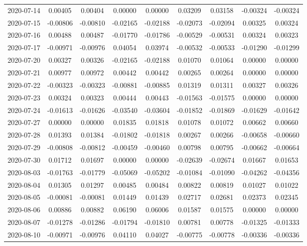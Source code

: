 \begin{footnotesize}
\begin{longtable}{lcccccccc}
2020-07-14 & 0.00405 & 0.00404 & 0.00000 & 0.00000 & 0.03209 & 0.03158 & -0.00324 & -0.00324 \\
2020-07-15 & -0.00806 & -0.00810 & -0.02165 & -0.02188 & -0.02073 & -0.02094 & 0.00325 & 0.00324 \\
2020-07-16 & 0.00488 & 0.00487 & -0.01770 & -0.01786 & -0.00529 & -0.00531 & 0.00324 & 0.00323 \\
2020-07-17 & -0.00971 & -0.00976 & 0.04054 & 0.03974 & -0.00532 & -0.00533 & -0.01290 & -0.01299 \\
2020-07-20 & 0.00327 & 0.00326 & -0.02165 & -0.02188 & 0.01070 & 0.01064 & 0.00000 & 0.00000 \\
2020-07-21 & 0.00977 & 0.00972 & 0.00442 & 0.00442 & 0.00265 & 0.00264 & 0.00000 & 0.00000 \\
2020-07-22 & -0.00323 & -0.00323 & -0.00881 & -0.00885 & 0.01319 & 0.01311 & 0.00327 & 0.00326 \\
2020-07-23 & 0.00324 & 0.00323 & 0.00444 & 0.00443 & -0.01563 & -0.01575 & 0.00000 & 0.00000 \\
2020-07-24 & -0.01613 & -0.01626 & -0.03540 & -0.03604 & -0.01852 & -0.01869 & -0.01629 & -0.01642 \\
2020-07-27 & 0.00000 & 0.00000 & 0.01835 & 0.01818 & 0.01078 & 0.01072 & 0.00662 & 0.00660 \\
2020-07-28 & 0.01393 & 0.01384 & -0.01802 & -0.01818 & 0.00267 & 0.00266 & -0.00658 & -0.00660 \\
2020-07-29 & -0.00808 & -0.00812 & -0.00459 & -0.00460 & 0.00798 & 0.00795 & -0.00662 & -0.00664 \\
2020-07-30 & 0.01712 & 0.01697 & 0.00000 & 0.00000 & -0.02639 & -0.02674 & 0.01667 & 0.01653 \\
2020-08-03 & -0.01763 & -0.01779 & -0.05069 & -0.05202 & -0.01084 & -0.01090 & -0.04262 & -0.04356 \\
2020-08-04 & 0.01305 & 0.01297 & 0.00485 & 0.00484 & 0.00822 & 0.00819 & 0.01027 & 0.01022 \\
2020-08-05 & -0.00081 & -0.00081 & 0.01449 & 0.01439 & 0.02717 & 0.02681 & 0.02373 & 0.02345 \\
2020-08-06 & 0.00886 & 0.00882 & 0.06190 & 0.06006 & 0.01587 & 0.01575 & 0.00000 & 0.00000 \\
2020-08-07 & -0.01278 & -0.01286 & -0.01794 & -0.01810 & 0.00781 & 0.00778 & -0.01325 & -0.01333 \\
2020-08-10 & -0.00971 & -0.00976 & 0.04110 & 0.04027 & -0.00775 & -0.00778 & -0.00336 & -0.00336 \\

\end{longtable}
\end{footnotesize}
